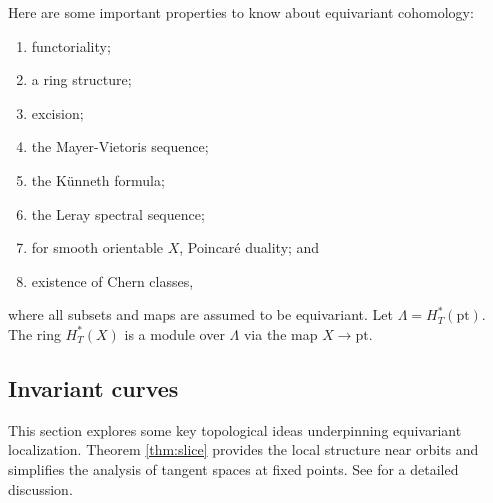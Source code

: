 Here are some important properties to know about equivariant cohomology:
\begin{enumerate}
	\item functoriality;
	\item a ring structure;
	\item excision;
	\item the Mayer-Vietoris sequence;
	\item the Künneth formula;
	\item the Leray spectral sequence;
	\item for smooth orientable $X$, Poincaré duality; and
	\item existence of Chern classes,
\end{enumerate}
where all subsets and maps are assumed to be equivariant. Let $\Lambda = H_T^*(\text{pt})$. The ring $H^*_T(X)$ is a module over $\Lambda$ via the map $X \to \text{pt}$.


\subsection{Invariant curves}
This section explores some key topological ideas underpinning equivariant localization. Theorem \ref{thm:slice} provides the local structure near orbits and simplifies the analysis of tangent spaces at fixed points. See \cite{fulton-anderson} for a detailed discussion.

